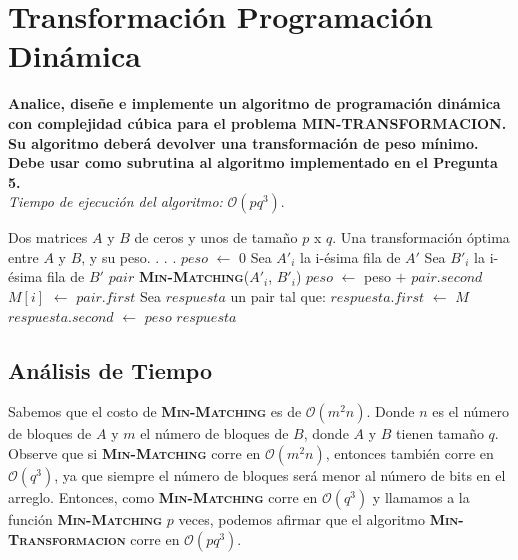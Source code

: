 \documentclass[12pt,a4,paper]{article}
\begin{document}
\section{Transformación Programación Dinámica}

\textbf{Analice, diseñe e implemente un algoritmo de programación dinámica con complejidad cúbica para el problema \textsc{MIN-TRANSFORMACION}. Su algoritmo deberá devolver una transformación de peso mínimo. Debe usar como subrutina al algoritmo implementado en el Pregunta 5.} \\

\textit{Tiempo de ejecuci\'on del algoritmo:} $\mathcal{O}(pq^3)$.\newline

\begin{algorithmic}[1]
    \REQUIRE Dos matrices $A$ y $B$ de ceros y unos de tamaño $p$ x $q$.
    \ENSURE Una transformación óptima entre $A$ y $B$, y su peso.\newline\newline
    .
    .
    .
    \STATE
    \STATE $peso$ $\gets$ $0$
    \STATE
        \STATE Sea $A'_i$ la i-ésima fila de $A'$
        \STATE Sea $B'_i$ la i-ésima fila de $B'$
        \STATE $pair$ \gets \textbf{\textsc{Min-Matching}}($A'_i$, $B'_i$)
        \STATE $peso$ $\gets$ peso $+$ $pair.second$
        \STATE $M[i]$ $\gets$ $pair.first$
    \ENDFOR
    \STATE
    \STATE Sea $respuesta$ un pair tal que:
    \STATE $respuesta.first$ $\gets$ $M$
    \STATE $respuesta.second$ $\gets$ $peso$
    \STATE
    \RETURN $respuesta$
\end{algorithmic}

\subsection*{Análisis de Tiempo}

Sabemos que el costo de \textbf{\textsc{Min-Matching}} es de $\mathcal{O}(m^{2}n)$. Donde $n$ es el número de bloques de $A$ y $m$ el número de bloques de $B$, donde $A$ y $B$ tienen tamaño $q$. Observe que si \textbf{\textsc{Min-Matching}} corre en $\mathcal{O}(m^{2}n)$, entonces también corre en $\mathcal{O}(q^3)$, ya que siempre el número de bloques será menor al número de bits en el arreglo. Entonces, como \textbf{\textsc{Min-Matching}} corre en $\mathcal{O}(q^3)$ y llamamos a la función \textbf{\textsc{Min-Matching}} $p$ veces, podemos afirmar que el algoritmo \textbf{\textsc{Min-Transformacion}} corre en $\mathcal{O}(pq^3)$.
\end{document}

